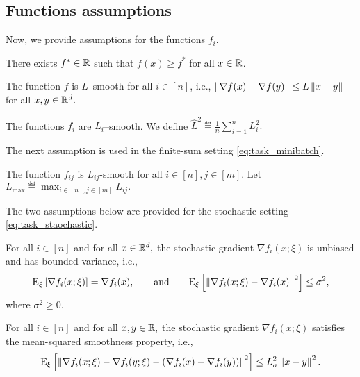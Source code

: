 \documentclass{article}
\begin{document}
\subsection{Functions assumptions}
Now, we provide assumptions for the functions $f_i.$
\begin{assumption}
    \label{ass:lower_bound}
    There exists $f^* \in \mathbb{R}$ such that $f(x) \geq f^*$ for all $x \in \mathbb{R}$.
\end{assumption}
\begin{assumption}
    \label{ass:lipschitz_constant}
    The function $f$ is $L$--smooth for all $i \in [n]$, i.e., $\left\| \nabla f(x) - \nabla f(y) \right\| \leq L \left\| x - y \right\|$ for all $x, y \in \mathbb{R}^d.$
\end{assumption}
\begin{assumption} \leavevmode
    \label{ass:nodes_lipschitz_constant}
    The functions $f_i$ are $L_i$--smooth. We define $\widehat{L}^2 \eqdef \frac{1}{n} \sum_{i=1}^{n} L_i^2.$
\end{assumption}
The next assumption is used in the finite-sum setting \eqref{eq:task_minibatch}.
\begin{assumption}
    \label{ass:max_lipschitz_constant}
    The function $f_{ij}$ is $L_{ij}$-smooth for all $i \in [n], j \in [m].$ Let $L_{\max} \eqdef \max_{i \in [n], j \in [m]} L_{ij}.$
\end{assumption}
The two assumptions below are provided for the stochastic setting \eqref{eq:task_staochastic}.
\begin{assumption}
    \label{ass:stochastic_unbiased_and_variance_bounded}
    For all $i \in [n]$ and for all $x \in \mathbb{R}^d,$ the stochastic gradient $\nabla f_i(x;\xi)$ is unbiased and has bounded variance, i.e.,
    $${\rm E}_{\xi}\left[\nabla f_i(x;\xi)\right] = \nabla f_i(x), \qquad \text{and} \qquad {\rm E}_{\xi}\left[\left\| \nabla f_i(x;\xi) - \nabla f_i(x) \right\|^2\right] \leq \sigma^2,$$ 
    where $\sigma^2 \geq 0.$
\end{assumption}
\begin{assumption}
    \label{ass:mean_square_smoothness}
    For all $i \in [n]$ and for all $x, y \in \mathbb{R},$ the stochastic gradient $\nabla f_i(x;\xi)$ satisfies the mean-squared smoothness property, i.e.,
    $${\rm E}_{\xi}\left[\left\| \nabla f_i(x;\xi) - \nabla f_i(y;\xi) - \left(\nabla f_i(x) - \nabla f_i(y)\right) \right\|^2\right] \leq L_{\sigma}^2 \left\| x - y \right\|^2.$$
\end{assumption}
\end{document}

